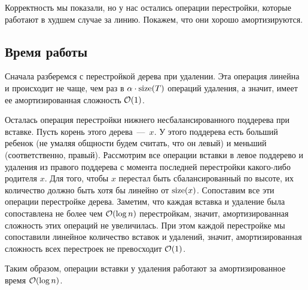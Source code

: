 Корректность мы показали, но у нас остались операции перестройки, которые работают в худшем случае за линию. Покажем, что они хорошо амортизируются.

\subsection{Время работы}

Сначала разберемся с перестройкой дерева при удалении. Эта операция линейна и происходит не чаще, чем раз в $\alpha \cdot \operatorname{size}(T)$ операций удаления, а значит, имеет ее амортизированная сложность $\mathcal{O}(1)$.

Осталась операция перестройки нижнего несбалансированного поддерева при вставке. Пусть корень этого дерева~---~$x$. У этого поддерева есть больший ребенок (не умаляя общности будем считать, что он левый) и меньший (соответственно, правый). Рассмотрим все операции вставки в левое поддерево и удаления из правого поддерева с момента последней перестройки какого-либо родителя $x$. Для того, чтобы $x$ перестал быть сбалансированный по высоте, их количество должно быть хотя бы линейно от $\operatorname{size}(x)$. Сопоставим все эти операции перестройке дерева. Заметим, что каждая вставка и удаление была сопоставлена не более чем $\mathcal{O}(\log n)$ перестройкам, значит, амортизированная сложность этих операций не увеличилась. При этом каждой перестройке мы сопоставили линейное количество вставок и удалений, значит, амортизированная сложность всех перестроек не превосходит $\mathcal{O}(1)$.

Таким образом, операции вставки у удаления работают за амортизированное время $\mathcal{O}(\log n)$.
